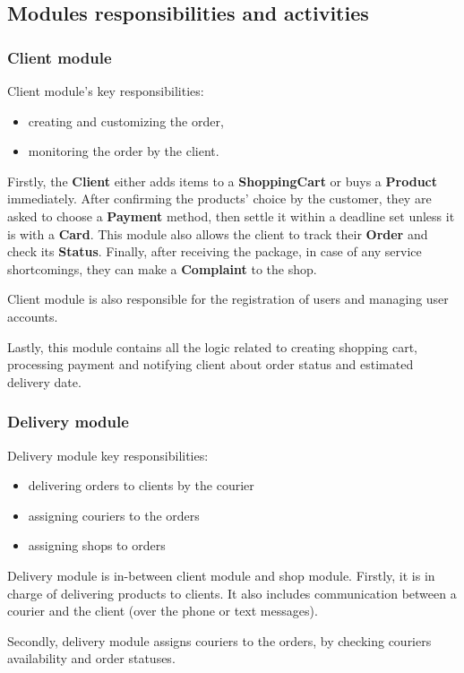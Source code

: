 \documentclass[../main.tex]{subfiles}
\begin{document}
\subsection{Modules responsibilities and activities}

\subsubsection{Client module}
Client module's key responsibilities:
\begin{itemize}
\item creating and customizing the order,
\item monitoring the order by the client.
\end{itemize}

Firstly, the \textbf{Client} either adds items to a \textbf{ShoppingCart} or buys a \textbf{Product} immediately. After confirming the products' choice by the customer, they are asked to choose a \textbf{Payment} method, then settle it within a deadline set unless it is with a \textbf{Card}. This module also allows the client to track their \textbf{Order} and check its \textbf{Status}. Finally, after receiving the package, in case of any service shortcomings, they can make a \textbf{Complaint} to the shop.


Client module is also responsible for the registration of users and managing user accounts. 

Lastly, this module contains all the logic related to creating shopping cart, processing payment and notifying client about order status and estimated delivery date.

\subsubsection{Delivery module}

Delivery module key responsibilities: 
\begin{itemize}
  \item delivering orders to clients by the courier
  \item assigning couriers to the orders
  \item assigning shops to orders
\end{itemize}
Delivery module is in-between client module and shop module. Firstly, it is in charge of delivering products to clients. It also includes communication between a courier and the client (over the phone or text messages).

Secondly, delivery module assigns couriers to the orders, by checking couriers availability and order statuses.
\end{document}

